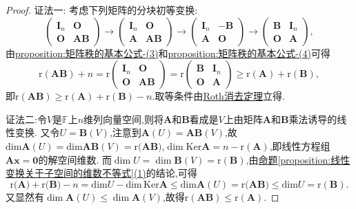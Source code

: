\documentclass[../../main.tex]{subfiles}%
\begin{document}
\begin{proof}

{\color{blue}证法一:}
考虑下列矩阵的分块初等变换:
\[
\begin{pmatrix}
\boldsymbol{I}_n&\boldsymbol{O}\\
\boldsymbol{O}&\boldsymbol{A}\boldsymbol{B}
\end{pmatrix}\to
\begin{pmatrix}
\boldsymbol{I}_n&\boldsymbol{O}\\
\boldsymbol{A}&\boldsymbol{A}\boldsymbol{B}
\end{pmatrix}\to
\begin{pmatrix}
\boldsymbol{I}_n&-\boldsymbol{B}\\
\boldsymbol{A}&\boldsymbol{O}
\end{pmatrix}\to
\begin{pmatrix}
\boldsymbol{B}&\boldsymbol{I}_n\\
\boldsymbol{O}&\boldsymbol{A}
\end{pmatrix},
\]
由\hyperref[proposition:矩阵秩的基本公式-3]{proposition:矩阵秩的基本公式-(3)}和\hyperref[proposition:矩阵秩的基本公式-4]{proposition:矩阵秩的基本公式-(4)}可得
\[
\mathrm{r}(\boldsymbol{A}\boldsymbol{B}) + n=\mathrm{r}\begin{pmatrix}
\boldsymbol{I}_n&\boldsymbol{O}\\
\boldsymbol{O}&\boldsymbol{A}\boldsymbol{B}
\end{pmatrix}=\mathrm{r}\begin{pmatrix}
\boldsymbol{B}&\boldsymbol{I}_n\\
\boldsymbol{O}&\boldsymbol{A}
\end{pmatrix}\geqslant \mathrm{r}(\boldsymbol{A})+\mathrm{r}(\boldsymbol{B}),
\]
即\(\mathrm{r}(\boldsymbol{A}\boldsymbol{B})\geqslant \mathrm{r}(\boldsymbol{A})+\mathrm{r}(\boldsymbol{B}) - n\).取等条件由\hyperref[theorem:Roth消去定理]{Roth消去定理}立得.

{\color{blue}证法二:}令\(V\)是\(\mathbb{F}\)上\(n\)维列向量空间,则将\(\boldsymbol{A}\)和\(\boldsymbol{B}\)看成是\(V\)上由矩阵\(\boldsymbol{A}\)和\(\boldsymbol{B}\)乘法诱导的线性变换. 又令\(U = \boldsymbol{B}(V)\),注意到\(\boldsymbol{A}(U)=\boldsymbol{A}\boldsymbol{B}(V)\),故\(\mathrm{dim}\boldsymbol{A}(U)=\mathrm{dim}\boldsymbol{AB}(V)=\mathrm{r(}\boldsymbol{AB})\),\(\dim\text{Ker}\boldsymbol{A}=n - \text{r}(\boldsymbol{A})\),即线性方程组\(\boldsymbol{A}\boldsymbol{x}=\boldsymbol{0}\)的解空间维数. 而\(\dim U=\dim\boldsymbol{B}(V)=\text{r}(\boldsymbol{B})\),由\hyperref[proposition:线性变换关于子空间的维数不等式]{命题\ref{proposition:线性变换关于子空间的维数不等式}(1)}的结论,可得
\[
\mathrm{r(}\boldsymbol{A})+\mathrm{r(}\boldsymbol{B})-n=\mathrm{dim}U-\mathrm{dim}\,\mathrm{Ker}\boldsymbol{A}\leqslant \mathrm{dim}\boldsymbol{A}\left( U \right) =\mathrm{r(}\boldsymbol{AB})\leqslant \mathrm{dim}U=\mathrm{r}\left( \boldsymbol{B} \right).
\]
又显然有\(\dim\boldsymbol{A}(U)\leqslant \dim\boldsymbol{A}(V)\),故得\(\text{r}(\boldsymbol{A}\boldsymbol{B})\leqslant \text{r}(\boldsymbol{A})\).


\end{proof}
\end{document}
